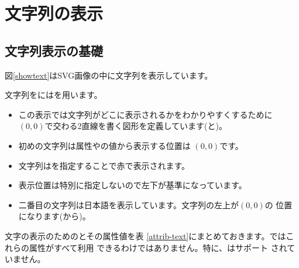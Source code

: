 \chapter{文字列の表示}\label{ShowText}
\section{文字列表示の基礎}
図\ref{showtext}はSVG画像の中に文字列を表示しています。

文字列をにはを用います。
{}
\begin{itemize}
 \item この表示では文字列がどこに表示されるかをわかりやすくするために
       $(0,0)$で交わる2直線を書く図形を定義しています(と)。
 \item 初めの文字列は属性やの値から表示する位置は
       $(0,0)$です。
 \item 文字列はを指定することで赤で表示されます。
 \item 表示位置は特別に指定しないので左下が基準になっています。
 \item 二番目の文字列は日本語を表示しています。文字列の左上が$(0,0)$の
       位置になります(から)。
\end{itemize}
文字の表示のためのとその属性値を表
\ref{attrib-text}にまとめておきます。\Opera ではこれらの属性がすべて利用
できるわけではありません。特に、はサポート
されていません。

